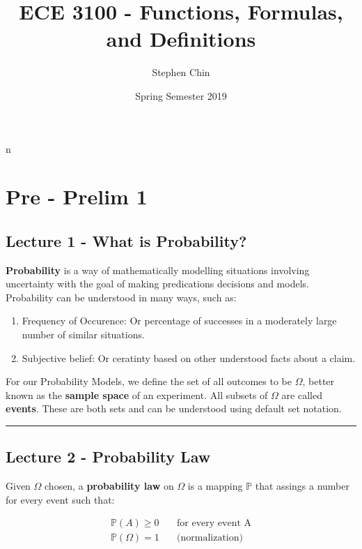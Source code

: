 n\documentclass{article}
\title{ECE 3100 - Functions, Formulas, and Definitions}
\author{Stephen Chin}
\date{Spring Semester 2019}
\begin{document}
\maketitle
\tableofcontents
\newpage

\section{Pre - Prelim 1}

\subsection{Lecture 1 - What is Probability?}

\textbf{Probability} is a way of mathematically modelling situations
involving uncertainty with the goal of making predications decisions
and models. Probability can be understood in many ways, such as:

\begin{enumerate}
\item Frequency of Occurence: Or percentage of successes in a
  moderately large number of similar situations.
  
\item Subjective belief: Or ceratinty based on other understood facts
  about a claim.
\end{enumerate}

For our Probability Models, we define the set of all outcomes to be
$\Omega$, better known as the \textbf{sample space} of an
experiment. All subsets of $\Omega$ are called \textbf{events}. These
are both sets and can be understood using default set notation.


\medskip \hrule
\subsection{Lecture 2 - Probability Law}

Given $\Omega$ chosen, a \textbf{probability law} on $\Omega$ is a
mapping $\mathbb{P}$ that assings a number for every event such that:

\begin{equation} \tag{Kolmogorov's Axioms} \boxed{
    \begin{aligned} \mathbb{P}(A) \ge 0 & \quad \text{for every event
        A} \\ \mathbb{P}(\Omega) = 1 & \quad \text{(normalization)}
    \end{aligned} }
\end{equation}
\end{document}
